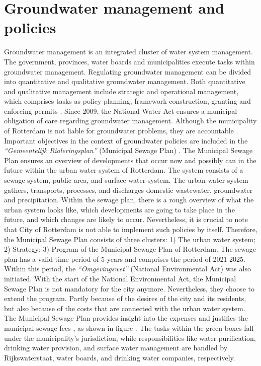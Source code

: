 \section{Groundwater management and policies} 
Groundwater management is an integrated cluster of water system management. The government, provinces, water boards and municipalities execute tasks within groundwater management. Regulating groundwater management can be divided into quantitative and qualitative groundwater management. Both quantitative and qualitative management include strategic and operational management, which comprises tasks as policy planning, framework construction, granting and enforcing  permits \cite{rws-wvl-2012}. Since 2009, the National Water Act ensures a municipal obligation of care regarding groundwater management. Although the municipality of Rotterdam is not liable for groundwater problems, they are accountable \cite{gemeente-rotterdam-no-dateA}. Important objectives in the context of groundwater policies are included in the\textit{ “Gemeentelijk Rioleringsplan”} (Municipal Sewage Plan) \cite{gemeente-rotterdam-2020B}. The Municipal Sewage Plan ensures an overview of developments that occur now and possibly can in the future within the urban water system of Rotterdam. The system consists of a sewage system, public area, and surface water system. The urban water system gathers, transports, processes, and discharges domestic wastewater, groundwater and precipitation. Within the sewage plan, there is a rough overview of what the urban system looks like, which developments are going to take place in the future, and which changes are likely to occur. Nevertheless, it is crucial to note that City of Rotterdam is not able to implement such policies by itself. Therefore, the Municipal Sewage Plan consists of three clusters: 1) The urban water system; 2) Strategy; 3) Program of the Municipal Sewage Plan of Rotterdam. The sewage plan has a valid time period of 5 years and comprises the period of 2021-2025. Within this period, the \textit{“Omgevingswet”} (National Environmental Act) was also initiated. With the start of the National Environmental Act, the Municipal Sewage Plan is not mandatory for the city anymore. Nevertheless, they choose to extend the program. Partly because of the desires of the city and its residents, but also because of the costs that are connected with the urban water system. The Municipal Sewage Plan provides insight into the expenses and justifies the municipal sewage fees \cite{gemeente-rotterdam-2020B}, as shown in figure . The tasks within the green boxes fall under the municipality's jurisdiction, while responsibilities like water purification, drinking water provision, and surface water management are handled by Rijkswaterstaat, water boards, and drinking water companies, respectively.
